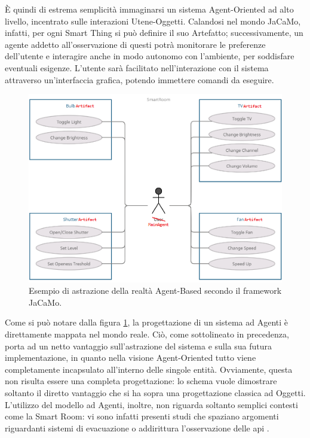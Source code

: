 \documentclass[12pt,a4paper,openright,oneside]{report}
\begin{document}
È quindi di estrema semplicità immaginarsi un sistema Agent-Oriented ad alto livello, incentrato sulle interazioni Utene-Oggetti. Calandosi nel mondo JaCaMo, infatti, per ogni Smart Thing si può definire il suo Artefatto; successivamente, un agente addetto all'osservazione di questi potrà monitorare le preferenze dell'utente e interagire anche in modo autonomo con l'ambiente, per soddisfare eventuali esigenze. L'utente sarà facilitato nell'interazione con il sistema attraverso un'interfaccia grafica, potendo immettere comandi da eseguire.

\begin{figure}[h]
	\centering
	\includegraphics[scale=0.5]{eps/use-case-jacamo.png}
	\caption{Esempio di astrazione della realtà Agent-Based secondo il framework JaCaMo.}
	\label{fig:use-case-diagram-high-agent}
\end{figure}

Come si può notare dalla figura \ref{fig:use-case-diagram-high-agent}, la progettazione di un sistema ad Agenti è direttamente mappata nel mondo reale. Ciò, come sottolineato in precedenza, porta ad un netto vantaggio sull'astrazione del sistema e sulla sua futura implementazione, in quanto nella visione Agent-Oriented tutto viene completamente incapsulato all'interno delle singole entità. Ovviamente, questa non risulta essere una completa progettazione: lo schema vuole dimostrare soltanto il diretto vantaggio che si ha sopra una progettazione classica ad Oggetti.\\

L'utilizzo del modello ad Agenti, inoltre, non riguarda soltanto semplici contesti come la Smart Room: vi sono infatti presenti studi che spaziano argomenti riguardanti sistemi di evacuazione \cite{evacuation} o addirittura l'osservazione delle api \cite{bee}.
\end{document}
